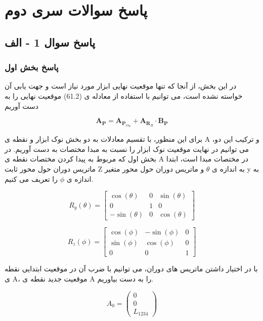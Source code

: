
\chapter{پاسخ سوالات سری دوم}

\section{پاسخ سوال 1 - الف}

\subsection{پاسخ بخش اول}
در این بخش، از آنجا که تنها موقعیت نهایی ابزار مورد نیاز است و جهت یابی آن خواسته نشده است، می توانیم با استفاده از معادله ی (61.2) موقعیت نهایی را به دست آوریم

\[
\mathbf{A}_{\mathbf{P}} = \mathbf{A}_{\mathbf{P}_{O_B}} + \mathbf{A}_{\mathbf{R}_{B}} \cdot \mathbf{B}_{\mathbf{P}}
\]

برای این منظور، با تقسیم معادلات به دو بخش نوک ابزار و نقطه ی A و ترکیب این دو، می توانیم در نهایت موقعیت نوک ابزار را نسبت به مبدا مختصات به دست آوریم.
در بخش اول که مربوط به پیدا کردن مختصات نقطه ی A در مختصات مبدا است، ابتدا ماتریس دوران حول محور ثابت Z به اندازه ی $\theta$ و ماتریس دوران حول محور متغیر y به اندازه ی $\phi$ را تعریف می کنیم.

\[
R_y(\theta) = \begin{bmatrix}
	\cos(\theta) & 0 & \sin(\theta) \\
	0 & 1 & 0 \\
	-\sin(\theta) & 0 & \cos(\theta)
\end{bmatrix}
\]

\[
R_z(\phi) = \begin{bmatrix}
	\cos(\phi) & -\sin(\phi) & 0 \\
	\sin(\phi) & \cos(\phi) & 0 \\
	0 & 0 & 1
\end{bmatrix}
\]

با در اختیار داشتن ماتریس های دوران، می توانیم با ضرب آن  در موقعیت ابتدایی نقطه ی A، موقعیت جدید نقطه ی A را به دست بیاوریم.

\[
A_0 =
\begin{pmatrix}
	0 \\
	0 \\
	L_{1234}
\end{pmatrix}
\]

